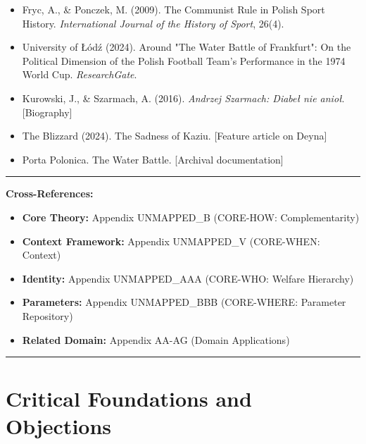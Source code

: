 \begin{itemize}
    \item Fryc, A., \& Ponczek, M. (2009). The Communist Rule in Polish Sport History.
    \textit{International Journal of the History of Sport}, 26(4).

    \item University of Łódź (2024). Around "The Water Battle of Frankfurt":
    On the Political Dimension of the Polish Football Team's Performance
    in the 1974 World Cup. \textit{ResearchGate}.

    \item Kurowski, J., \& Szarmach, A. (2016). \textit{Andrzej Szarmach:
    Diabeł nie anioł}. [Biography]

    \item The Blizzard (2024). The Sadness of Kaziu. [Feature article on Deyna]

    \item Porta Polonica. The Water Battle. [Archival documentation]
\end{itemize}



\vspace{2em}
\hrule
\vspace{1em}

\textbf{Cross-References:}
\begin{itemize}
    \item \textbf{Core Theory:} Appendix UNMAPPED_B (CORE-HOW: Complementarity)
    \item \textbf{Context Framework:} Appendix UNMAPPED_V (CORE-WHEN: Context)
    \item \textbf{Identity:} Appendix UNMAPPED_AAA (CORE-WHO: Welfare Hierarchy)
    \item \textbf{Parameters:} Appendix UNMAPPED_BBB (CORE-WHERE: Parameter Repository)
    \item \textbf{Related Domain:} Appendix AA-AG (Domain Applications)
\end{itemize}

\vspace{1em}
\hrule



\section{Critical Foundations and Objections}
\label{sec:bm-foundations}

